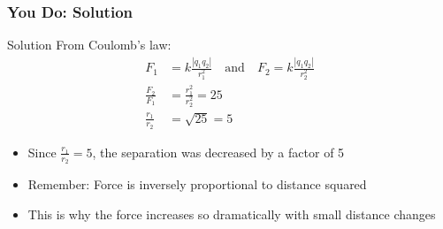 \documentclass{beamer}
\newcommand{\highlight}[1]{\textcolor{ds9red}{#1}}
\begin{document}
\begin{frame}
    \frametitle{You Do: Solution}
    
    \begin{block}{Solution}
        From Coulomb's law:
        \begin{align}
            F_1 &= k\frac{|q_1 q_2|}{r_1^2} \quad \text{and} \quad F_2 = k\frac{|q_1 q_2|}{r_2^2}\\
            \frac{F_2}{F_1} &= \frac{r_1^2}{r_2^2} = 25\\
            \frac{r_1}{r_2} &= \sqrt{25} = 5
        \end{align}
    \end{block}
    
    \begin{itemize}
        \item Since $\frac{r_1}{r_2} = 5$, the separation was \highlight{decreased by a factor of 5}
        \item Remember: Force is inversely proportional to distance \highlight{squared}
        \item This is why the force increases so dramatically with small distance changes
    \end{itemize}
\end{frame}
\end{document}
